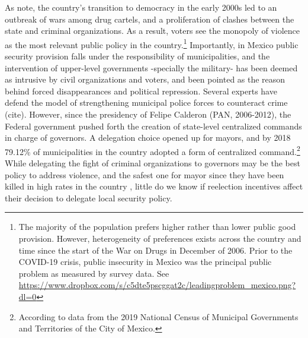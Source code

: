 \documentclass[12pt]{amsart}
\numberwithin{equation}{section}
\theoremstyle{definition}
\theoremstyle{definition}
\theoremstyle{definition}
\begin{document}
As \citet{ley_trejo_2020} note, the country's transition to democracy in the early 2000s led to an outbreak of wars among drug cartels, and a proliferation of clashes between the state and criminal organizations. As a result, voters see the monopoly of violence as the most relevant public policy in the country.\footnote{The majority of the population prefers higher rather than lower public good provision. However, heterogeneity of preferences exists across the country and time since the start of the War on Drugs in December of 2006. Prior to the COVID-19 crisis, public insecurity in Mexico was the principal public problem as measured by survey data. See \url{https://www.dropbox.com/s/c5dte5pscggat2c/leadingproblem_mexico.png?dl=0}} Importantly, in Mexico public security provision falls under the responsibility of municipalities, and the intervention of upper-level governments -specially the military- has been deemed as intrusive by civil organizations and voters, and been pointed as the reason behind forced disappearances and political repression. Several experts have defend the model of strengthening municipal police forces to counteract crime (cite). However, since the presidency of Felipe Calderon (PAN, 2006-2012), the Federal government pushed forth the creation of state-level centralized commands in charge of governors. A delegation choice opened up for mayors, and by 2018 79.12\% of municipalities in the country adopted a form of centralized command.\footnote{According to data from the 2019 National Census of Municipal Governments and Territories of the City of Mexico.} While delegating the fight of criminal organizations to governors may be the best policy to address violence, and the safest one for mayor since they have been killed in high rates in the country \citep{ley_trejo_2020}, little do we know if reelection incentives affect their decision to delegate local security policy. %
\end{document}
